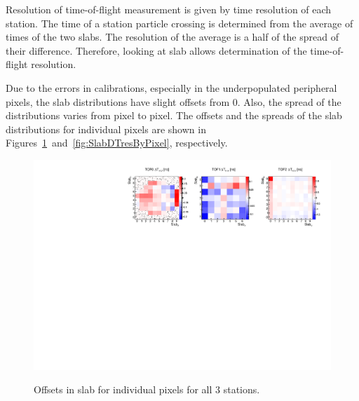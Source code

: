 Resolution of time-of-flight measurement is given by time resolution
of each station. The time of a station particle crossing is determined
from the average of times of the two slabs. The resolution of the
average is a half of the spread of their difference. Therefore,
looking at slab \DT{} allows determination of the time-of-flight
resolution.

Due to the errors in calibrations, especially in the underpopulated
peripheral pixels, the slab \DT{} distributions have slight offsets
from 0. Also, the spread of the distributions varies from pixel to
pixel. The offsets and the spreads of the slab \DT{} distributions for
individual pixels are shown in
Figures~\ref{fig:SlabDToffsetByPixel}~and~\ref{fig:SlabDTresByPixel},
respectively.


\begin{figure}
  \begin{center}
  \includegraphics[width=15cm]{05_slab_dt_offset_by_pixel_2d} \\
  \caption{Offsets in slab \DT{} for individual pixels for all 3 stations.}
  \label{fig:SlabDToffsetByPixel}
  \end{center}
\end{figure}


